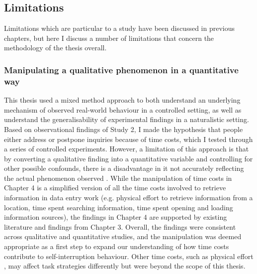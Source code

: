 
\subsection{Limitations}
Limitations which are particular to a study have been discussed in previous chapters, but here I discuss a number of limitations that concern the methodology of the thesis overall. 

\subsubsection{Manipulating a qualitative phenomenon in a quantitative way}
This thesis used a mixed method approach to both understand an underlying mechanism of observed real-world behaviour in a controlled setting, as well as understand the generalisability of experimental findings in a naturalistic setting. Based on observational findings of Study 2, I made the hypothesis that people either address or postpone inquiries because of time costs, which I tested through a series of controlled experiments. However, a limitation of this approach is that by converting a qualitative finding into a quantitative variable and controlling for other possible confounds, there is a disadvantage in it not accurately reflecting the actual phenomenon observed \citep{Driscoll2007}. While the manipulation of time costs in Chapter 4 is a simplified version of all the time costs involved to retrieve information in data entry work (e.g. physical effort to retrieve information from a location, time spent searching information, time spent opening and loading information sources), the findings in Chapter 4 are supported by existing literature and findings from Chapter 3. Overall, the findings were consistent across qualitative and quantitative studies, and the manipulation was deemed appropriate as a first step to expand our understanding of how time costs contribute to self-interruption behaviour. Other time costs, such as physical effort \citep{Potts2017}, may affect task strategies differently but were beyond the scope of this thesis. 

